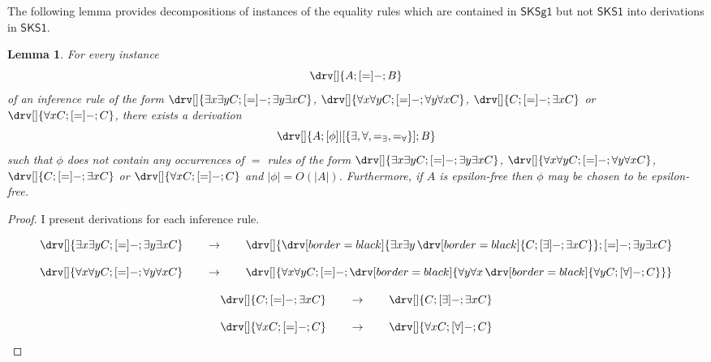 \documentclass[10pt]{article}
\newtheorem{lemma}[theorem]{Lemma}
\theoremstyle{definition}\newtheorem{remark}[theorem]{Remark}
\theoremstyle{definition}\newtheorem{example}[theorem]{Example}
\theoremstyle{definition}\newtheorem{definition}[theorem]{Definition}
\newcommand{\SKSq}{{\mathsf{SKSg1}}}
\newcommand{\SKSqDecomp}{{\mathsf{SKS1}}}
\newcommand{\eqExists}{=_{\exists}}
\newcommand{\eqForall}{=_{\forall}}
\begin{document}
	The following lemma provides decompositions of instances of the equality rules which are contained in $\SKSq$ but not $\SKSqDecomp$ into derivations in $\SKSqDecomp$.
	
	\begin{lemma}\label{EqualityDecomposition}
		For every instance
		\[
		\drv[] {
			A ; [=]- ; B
		}
		\]
		of an inference rule of the form $\drv[] {\exists x \exists y C ; [=]- ; \exists y \exists x C}$, $\drv[] {\forall x \forall y C ; [=]- ; \forall y \forall x C}$, $\drv[] {C ; [=]- ; \exists x C}$ or $\drv[] {\forall x C ; [=]- ; C}$, there exists a derivation
		\[
		\drv[] {
			A ; [\phi]|[\{\exists, \forall, \eqExists, \eqForall\}] ; B
		}
		\]
		such that $\phi$ does not contain any occurrences of $=$ rules of the form $\drv[] {\exists x \exists y C ; [=]- ; \exists y \exists x C}$, $\drv[] {\forall x \forall y C ; [=]- ; \forall y \forall x C}$, $\drv[] {C ; [=]- ; \exists x C}$ or $\drv[] {\forall x C ; [=]- ; C}$ and $| \phi | = O(| A |)$. Furthermore, if $A$ is epsilon-free then $\phi$ may be chosen to be epsilon-free.
	\end{lemma}
	
	\begin{proof}
		I present derivations for each inference rule.
		
		\[
		\drv[] {
			\exists x \exists y C ; [=]- ; \exists y \exists x C
		} \hspace{2em} \rightarrow \hspace{2em} \drv[] {
			\drv[border=black] {
				\exists x \exists y \, \drv[border=black] {
					C ; [\exists]- ; \exists x C
				} 
			} ; [=]- ; \exists y \exists x C
		}
		\]
		
		\[
		\drv[] {
			\forall x \forall y C ; [=]- ; \forall y \forall x C
		} \hspace{2em} \rightarrow \hspace{2em} \drv[] {
			\forall x \forall y C ; [=]- ; \drv[border=black] {
				\forall y \forall x \, \drv[border=black] {
					\forall y C ; [\forall]- ; C
				}
			}
		}
		\]
		
		\[
		\drv[] {
			C ; [=]- ; \exists x C
		} \hspace{2em} \rightarrow \hspace{2em} \drv[] {
			C ; [\exists]- ; \exists x C
		}
		\]
		
		\[
		\drv[] {
			\forall x C ; [=]- ; C
		} \hspace{2em} \rightarrow \hspace{2em} \drv[] {
			\forall x C ; [\forall]- ; C
		}
		\]
	\end{proof}
	
\end{document}

